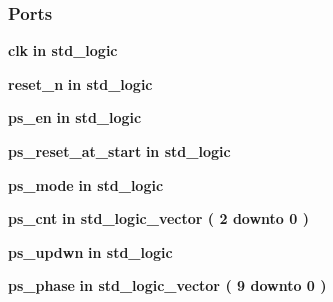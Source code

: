 \subsubsection*{Ports}
 \begin{DoxyCompactItemize}
\item 
{\bf clk}  {\bfseries {\bfseries \textcolor{keywordflow}{in}\textcolor{vhdlchar}{ }}} {\bfseries \textcolor{comment}{std\+\_\+logic}\textcolor{vhdlchar}{ }} 
\item 
{\bf reset\+\_\+n}  {\bfseries {\bfseries \textcolor{keywordflow}{in}\textcolor{vhdlchar}{ }}} {\bfseries \textcolor{comment}{std\+\_\+logic}\textcolor{vhdlchar}{ }} 
\item 
{\bf ps\+\_\+en}  {\bfseries {\bfseries \textcolor{keywordflow}{in}\textcolor{vhdlchar}{ }}} {\bfseries \textcolor{comment}{std\+\_\+logic}\textcolor{vhdlchar}{ }} 
\item 
{\bf ps\+\_\+reset\+\_\+at\+\_\+start}  {\bfseries {\bfseries \textcolor{keywordflow}{in}\textcolor{vhdlchar}{ }}} {\bfseries \textcolor{comment}{std\+\_\+logic}\textcolor{vhdlchar}{ }} 
\item 
{\bf ps\+\_\+mode}  {\bfseries {\bfseries \textcolor{keywordflow}{in}\textcolor{vhdlchar}{ }}} {\bfseries \textcolor{comment}{std\+\_\+logic}\textcolor{vhdlchar}{ }} 
\item 
{\bf ps\+\_\+cnt}  {\bfseries {\bfseries \textcolor{keywordflow}{in}\textcolor{vhdlchar}{ }}} {\bfseries \textcolor{comment}{std\+\_\+logic\+\_\+vector}\textcolor{vhdlchar}{ }\textcolor{vhdlchar}{(}\textcolor{vhdlchar}{ }\textcolor{vhdlchar}{ } \textcolor{vhdldigit}{2} \textcolor{vhdlchar}{ }\textcolor{keywordflow}{downto}\textcolor{vhdlchar}{ }\textcolor{vhdlchar}{ } \textcolor{vhdldigit}{0} \textcolor{vhdlchar}{ }\textcolor{vhdlchar}{)}\textcolor{vhdlchar}{ }} 
\item 
{\bf ps\+\_\+updwn}  {\bfseries {\bfseries \textcolor{keywordflow}{in}\textcolor{vhdlchar}{ }}} {\bfseries \textcolor{comment}{std\+\_\+logic}\textcolor{vhdlchar}{ }} 
\item 
{\bf ps\+\_\+phase}  {\bfseries {\bfseries \textcolor{keywordflow}{in}\textcolor{vhdlchar}{ }}} {\bfseries \textcolor{comment}{std\+\_\+logic\+\_\+vector}\textcolor{vhdlchar}{ }\textcolor{vhdlchar}{(}\textcolor{vhdlchar}{ }\textcolor{vhdlchar}{ } \textcolor{vhdldigit}{9} \textcolor{vhdlchar}{ }\textcolor{keywordflow}{downto}\textcolor{vhdlchar}{ }\textcolor{vhdlchar}{ } \textcolor{vhdldigit}{0} \textcolor{vhdlchar}{ }\textcolor{vhdlchar}{)}\textcolor{vhdlchar}{ }} 
\item 

\end{DoxyCompactItemize}
